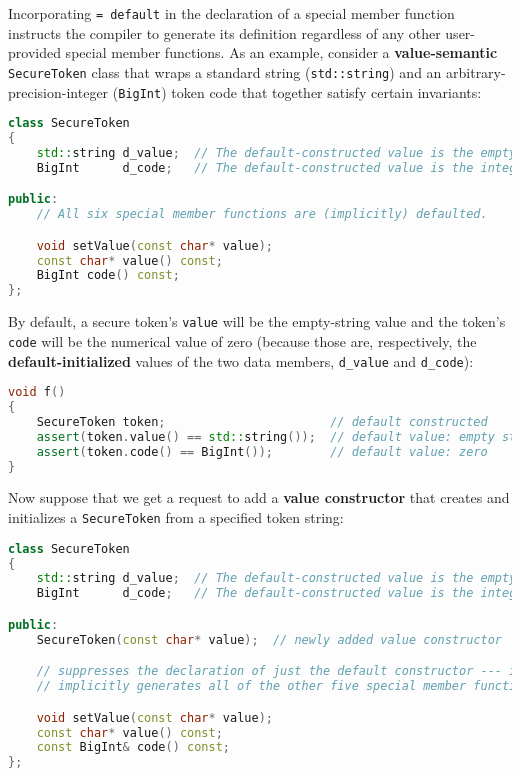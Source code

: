 Incorporating \texttt{=}~\texttt{default} in the declaration of a
special member function instructs the compiler to generate its
definition regardless of any other user-provided special member
functions. As an example, consider a \textbf{value-semantic}
\texttt{SecureToken} class that wraps a standard string
(\texttt{std::string}) and an arbitrary-precision-integer
(\texttt{BigInt}) token code that together satisfy certain invariants:

\begin{lstlisting}[language=C++]
class SecureToken
{
    std::string d_value;  // The default-constructed value is the empty string.
    BigInt      d_code;   // The default-constructed value is the integer zero.

public:
    // All six special member functions are (implicitly) defaulted.

    void setValue(const char* value);
    const char* value() const;
    BigInt code() const;
};
\end{lstlisting}

\noindent By default, a secure token's \texttt{value} will be the empty-string
value and the token's \texttt{code} will be the numerical value of zero
(because those are, respectively, the \textbf{default-initialized} values
of the two data members, \texttt{d\_value} and \texttt{d\_code}):

\begin{lstlisting}[language=C++,label=default-voidf-code]
void f()
{
    SecureToken token;                       // default constructed         (1)
    assert(token.value() == std::string());  // default value: empty string (2)
    assert(token.code() == BigInt());        // default value: zero         (3)
}
\end{lstlisting}

\noindent Now suppose that we get a request to add a \textbf{value constructor}
that creates and initializes a \texttt{SecureToken} from a specified
token string:

\begin{lstlisting}[language=C++]
class SecureToken
{
    std::string d_value;  // The default-constructed value is the empty string.
    BigInt      d_code;   // The default-constructed value is the integer zero.

public:
    SecureToken(const char* value);  // newly added value constructor

    // suppresses the declaration of just the default constructor --- i.e.,
    // implicitly generates all of the other five special member functions

    void setValue(const char* value);
    const char* value() const;
    const BigInt& code() const;
};
\end{lstlisting}

